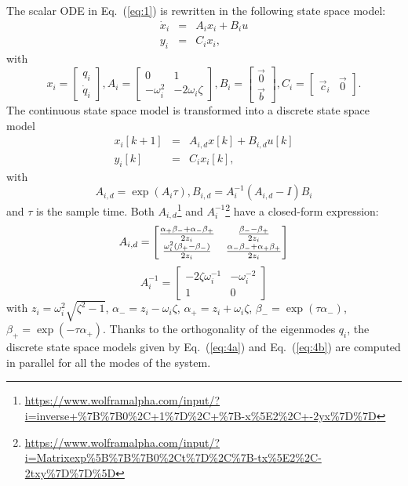 \documentclass{gmto}
\begin{document}
The scalar ODE in Eq.~(\ref{eq:1}) is rewritten in the following state space model:
\begin{eqnarray}
  \label{eq:3}
  \dot x_i &=& A_ix_i + B_iu   \\
  y_i &=& C_ix_i,
\end{eqnarray}
with
$$
x_i = \begin{bmatrix}
    q_i \\
    \dot q_i
    \end{bmatrix},
  A_i = \begin{bmatrix}
    0 & 1 \\
    -\omega_i^2 & -2\omega_i\zeta
    \end{bmatrix}  
    ,
    B_i = \begin{bmatrix}
      \vec 0 \\
      \vec b
      \end{bmatrix}
    ,
    C_i = \begin{bmatrix}
      \vec c_i & \vec 0
    \end{bmatrix}
    .
$$
  The continuous state space model is transformed into a discrete state space model
  \begin{eqnarray}
    \label{eq:4a}
  x_i[k+1] &=& A_{i,d} x[k] + B_{i,d} u[k] \\
    \label{eq:4b}
  y_i[k] &=& C_i x_i[k],
  \end{eqnarray}
  with
  $$
  A_{i,d} = \exp(A_i\tau),
   B_{i,d} = A_i^{-1}(A_{i,d}-I)B_i$$
  and $\tau$ is the sample time.
Both $A_{i,d}$\footnote{\url{https://www.wolframalpha.com/input/?i=inverse+\%7B\%7B0\%2C+1\%7D\%2C+\%7B-x\%5E2\%2C+-2yx\%7D\%7D}} and $A_i^{-1}$\footnote{\url{https://www.wolframalpha.com/input/?i=Matrixexp\%5B\%7B\%7B0\%2Ct\%7D\%2C\%7B-tx\%5E2\%2C-2txy\%7D\%7D\%5D}} have a closed-form expression:
\begin{equation}
  \label{eq:5}
  A_{i,d} = \begin{bmatrix}
    {\alpha_+\beta_- + \alpha_-\beta_+ \over 2z_i} & {\beta_- - \beta_+ \over 2z_i} \\
    {\omega_i^2 (\beta_+ - \beta_-) \over 2z_i} & {\alpha_-\beta_- + \alpha_+\beta_+ \over 2z_i}
    \end{bmatrix}
\end{equation}
\begin{equation}
  \label{eq:6}
  A_i^{-1} = \begin{bmatrix}
    -2\zeta\omega_i^{-1} & -\omega_i^{-2} \\
    1 & 0
  \end{bmatrix}  
\end{equation}
with $z_i=\omega_i^2\sqrt{\zeta^2-1}$, $\alpha_-=z_i-\omega_i\zeta$,
$\alpha_+=z_i+\omega_i\zeta$, $\beta_-=\exp(\tau\alpha_-)$,
$\beta_+=\exp(-\tau\alpha_+)$.
Thanks to the orthogonality of the eigenmodes $q_i$, the discrete state space
models given by Eq.~(\ref{eq:4a}) and Eq.~(\ref{eq:4b}) are computed in parallel for all the modes of
the system.
\end{document}
